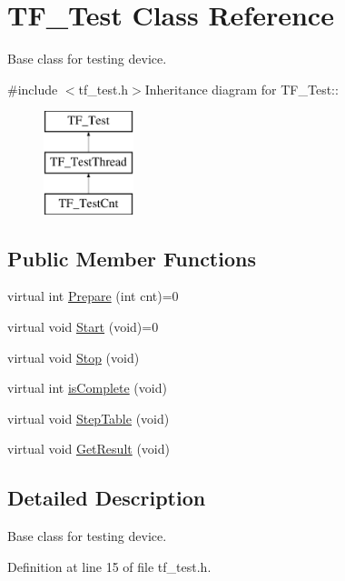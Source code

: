 \hypertarget{classTF__Test}{
\section{TF\_\-Test Class Reference}
\label{classTF__Test}
}


Base class for testing device.  


{\ttfamily \#include $<$tf\_\-test.h$>$}Inheritance diagram for TF\_\-Test::\begin{figure}[H]
\begin{center}
\leavevmode
\includegraphics[height=3cm]{classTF__Test}
\end{center}
\end{figure}
\subsection*{Public Member Functions}
\begin{DoxyCompactItemize}
\item 
virtual int \hyperlink{classTF__Test_a26630dcec87c80cd27ab33e3791fbe19}{Prepare} (int cnt)=0
\item 
virtual void \hyperlink{classTF__Test_aab4a87d980709f2756d440771b4e24ac}{Start} (void)=0
\item 
virtual void \hyperlink{classTF__Test_a710a0463dee6767fcb3a3e3d191978b7}{Stop} (void)
\item 
virtual int \hyperlink{classTF__Test_a14768dc0dba16b2cb7be89e8e7c2b3b0}{isComplete} (void)
\item 
virtual void \hyperlink{classTF__Test_ac27a7742873ed7afab48b540fe3d9215}{StepTable} (void)
\item 
virtual void \hyperlink{classTF__Test_a3e4bb4453e490c2a897ccc86b6e788bf}{GetResult} (void)
\end{DoxyCompactItemize}


\subsection{Detailed Description}
Base class for testing device. 

Definition at line 15 of file tf\_\-test.h.

